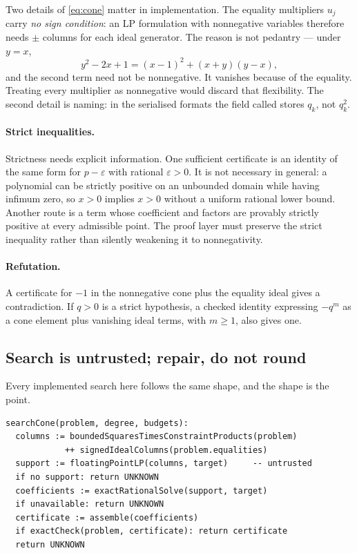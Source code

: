 Two details of \eqref{eq:cone} matter in implementation. The equality
multipliers $u_j$ carry \emph{no sign condition}: an LP formulation with
nonnegative variables therefore needs $\pm$ columns for each ideal generator.
The reason is not pedantry --- under $y=x$,
\[
 y^2-2x+1=(x-1)^2+(x+y)(y-x),
\]
and the second term need not be nonnegative. It vanishes because of the
equality. Treating every multiplier as nonnegative would discard that
flexibility. The second detail is naming: in the serialised formats the field
called  stores $q_k$, not $q_k^2$.

\paragraph{Strict inequalities.}
Strictness needs explicit information. One sufficient certificate is an identity
of the same form for $p-\varepsilon$ with rational $\varepsilon>0$. It is not
necessary in general: a polynomial can be strictly positive on an unbounded
domain while having infimum zero, so $x>0$ implies $x>0$ without a uniform
rational lower bound. Another route is a term whose coefficient and factors are
provably strictly positive at every admissible point. The proof layer must
preserve the strict inequality rather than silently weakening it to
nonnegativity.

\paragraph{Refutation.}
A certificate for $-1$ in the nonnegative cone plus the equality ideal gives a
contradiction. If $q>0$ is a strict hypothesis, a checked identity expressing
$-q^m$ as a cone element plus vanishing ideal terms, with $m\ge1$, also gives
one.

\subsection{Search is untrusted; repair, do not round}

Every implemented search here follows the same shape, and the shape is the
point.

\begin{lstlisting}
searchCone(problem, degree, budgets):
  columns := boundedSquaresTimesConstraintProducts(problem)
            ++ signedIdealColumns(problem.equalities)
  support := floatingPointLP(columns, target)     -- untrusted
  if no support: return UNKNOWN
  coefficients := exactRationalSolve(support, target)
  if unavailable: return UNKNOWN
  certificate := assemble(coefficients)
  if exactCheck(problem, certificate): return certificate
  return UNKNOWN
\end{lstlisting}

